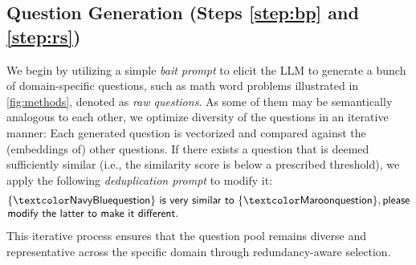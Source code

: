 \subsection{Question Generation (Steps \ref{step:bp} and \ref{step:rs})}

We begin by utilizing a simple \emph{bait prompt} to elicit the LLM to generate a bunch of domain-specific questions, such as math word problems illustrated in \cref{fig:methods}, denoted as \emph{raw questions}. As some of them may be semantically analogous to each other, we optimize diversity of the questions in an iterative manner: Each generated question is vectorized and compared against the (embeddings of) other questions. If there exists a question that is deemed sufficiently similar (i.e., the similarity score is below a prescribed threshold), we apply the following \emph{deduplication prompt} to modify it:
\begin{align*}
    &\promptfont{\{\nblue{question}\}~is~very~similar~to~\{\maroon{question}\}, please}\\[-1mm]
    &\promptfont{modify~the~latter~to~make~it~different.}
\end{align*}%
This iterative process ensures that the question pool remains diverse and representative across the specific domain through redundancy-aware selection.

